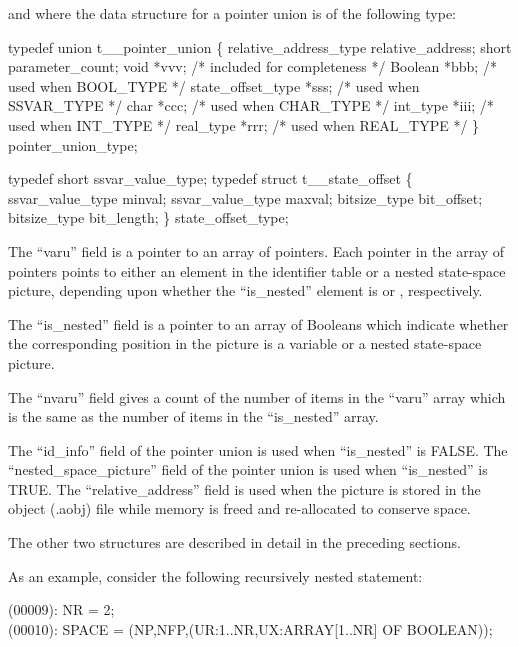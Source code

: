 and where the data structure for a pointer union is of the following type:
\begin{codeexample}
typedef union t__pointer_union
   \{
     relative_address_type relative_address;
     short parameter_count;
     void *vvv;               /* included for completeness */
     Boolean *bbb;            /* used when BOOL_TYPE */
     state_offset_type *sss;  /* used when SSVAR_TYPE */
     char *ccc;               /* used when CHAR_TYPE */
     int_type *iii;           /* used when INT_TYPE */
     real_type *rrr;          /* used when REAL_TYPE */
   \} pointer_union_type;
\end{codeexample}


\begin{codeexample}
typedef short ssvar_value_type;
typedef struct t__state_offset
   \{
      ssvar_value_type minval;
      ssvar_value_type maxval;
      bitsize_type bit_offset;
      bitsize_type bit_length;
   \} state_offset_type;
\end{codeexample}


The ``varu'' field is a pointer to an array of pointers.   Each pointer in
the array of pointers points to either an element in the identifier table
or a nested state-space picture, depending upon whether the ``is\_nested''
element is  or , respectively.

The ``is\_nested'' field is a pointer to an array of Booleans which indicate
whether the corresponding position in the picture is a variable or a nested
state-space picture.

The ``nvaru'' field gives a count of the number of items in the ``varu'' array
which is the same as the number of items in the ``is\_nested'' array.

The ``id\_info'' field of the pointer union is used when ``is\_nested'' is
FALSE.  The ``nested\_space\_picture'' field of the pointer union is used
when ``is\_nested'' is TRUE.   The ``relative\_address'' field is used when
the picture is stored in the object (.aobj) file while memory is freed and
re-allocated to conserve space.

The other two structures are described in detail in the preceding sections.

As an example, consider the following recursively nested  statement:
\begin{logfileexample}
(00009): NR = 2; \\
(00010): SPACE = (NP,NFP,(UR:1..NR,UX:ARRAY[1..NR] OF BOOLEAN)); \\
\end{logfileexample}

